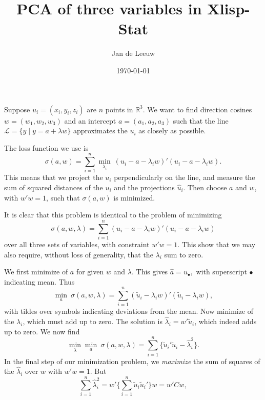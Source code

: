 \documentclass[12pt]{amsart}
\begin{document}
\title{PCA of three variables in Xlisp-Stat}
\author{Jan de Leeuw}
\date{\today}
\maketitle
Suppose $u_{i}=(x_{i},y_{i},z_{i})$ are $n$ points in $\mathbb{R}^{3}$.
We want to find direction cosines $w=(w_{1},w_{2},w_{3})$ and
an intercept $a=(a_{1},a_{2},a_{3})$ such that the
line $\mathcal{L}=\{y\mid y=a+\lambda w\}$ approximates the $u_{i}$
as closely as possible.\par
%
The loss function we use is
\begin{equation*}
\sigma(a,w)=\sum_{i=1}^{n}\min_{\lambda_{i}}\ (u_{i}-a-\lambda_{i}w)'
(u_{i}-a-\lambda_{i}w).
\end{equation*}
This means that we project the $u_{i}$ perpendicularly on the line,
and measure the sum of squared distances of the $u_{i}$ and the
projections $\hat u_{i}$. Then choose $a$ and $w$, with $w'w=1$,
such that $\sigma(a,w)$ is minimized.\par
%
It is clear that this problem is identical to the problem of minimizing
\begin{equation*}
\sigma(a,w,\lambda)=\sum_{i=1}^{n} (u_{i}-a-\lambda_{i}w)'(u_{i}-a-\lambda_{i}w)
\end{equation*}
over all three sets of variables, with constraint $w'w=1$. This show 
that we may also require, without loss of generality, that the 
$\lambda_{i}$ sum to zero.\par
%
We first minimize of $a$ for given $w$ and $\lambda$. This gives
$\hat a=u_{\bullet},$
with superscript $\bullet$ indicating mean. Thus
\begin{equation*}
\min_{a}\ \sigma(a,w,\lambda)=\sum_{i=1}^{n} (\tilde u_{i}-\lambda_{i}w)'
(\tilde u_{i}-\lambda_{i}w),
\end{equation*}
with tildes over symbols indicating deviations from the mean. Now 
minimize of the $\lambda_{i}$, which must add up to
zero. The solution is $\hat\lambda_{i}=w'\tilde u_{i}$, which indeed
adds up to zero. We now find
\begin{equation*}
\min_{\lambda}\min_{a}\ \sigma(a,w,\lambda)=\sum_{i=1}^{n}\{\tilde 
u_{i}'\tilde u_{i}^{}-\hat\lambda_{i}^{2}\}.
\end{equation*}
In the final step of our minimization problem, we \textit{maximize}
the sum of squares of the $\hat\lambda_{i}$ over $w$ with $w'w=1$. But
\begin{equation*}
\sum_{i=1}^{n}\hat\lambda_{i}^{2}=w'\{\sum_{i=1}^{n}\tilde u_{i}^{}
\tilde u_{i}'\}w=w'Cw,
\end{equation*}
\end{document}
